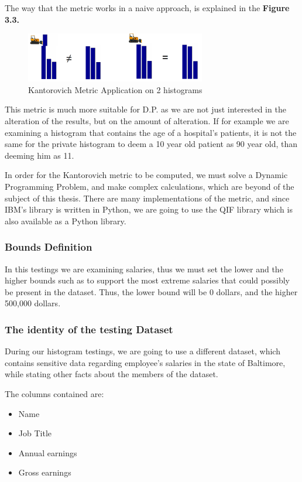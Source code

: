 The way that the metric works in a naive approach, is explained in the \textbf{Figure 3.3.}

\begin{figure}[!htb]\centering
    \includegraphics[width=0.7\textwidth]{images/emd.png}
    \caption{Kantorovich Metric Application on 2 histograms}
\end{figure}

This metric is much more suitable for D.P. as we are not just interested in the alteration of the results, but on the amount of alteration. If for example we are examining a histogram that contains the age of a hospital's patients, it is not the same for the private histogram to deem a 10 year old patient as 90 year old, than deeming him as 11. 

In order for the Kantorovich metric to be computed, we must solve a Dynamic Programming Problem, and make complex calculations, which are beyond of the subject of this thesis. There are many implementations of the metric, and since IBM's library is written in Python, we are going to use the QIF library %
which is also available as a Python library. 


\subsubsection{Bounds Definition}

In this testings we are examining salaries, thus we must set the lower and the higher bounds such as to support the most extreme salaries that could possibly be present in the dataset. Thus, the lower bound will be 0 dollars, and the higher 500,000 dollars.

\subsubsection{The identity of the testing Dataset}

During our histogram testings, we are going to use a different dataset, which contains  sensitive data regarding employee's salaries in the state of Baltimore, while stating other facts about the members of the dataset. 

The columns contained are: 
\begin{itemize}
    \item Name
    \item Job Title
    \item Annual earnings
    \item Gross earnings
\end{itemize}

